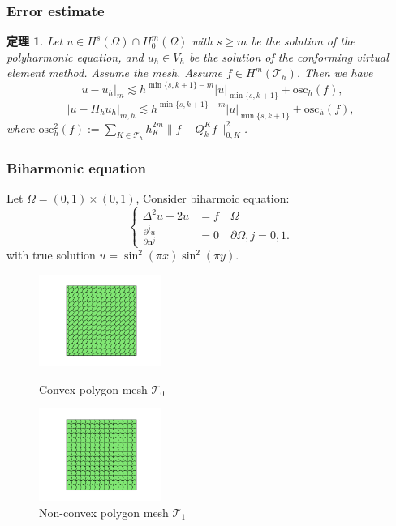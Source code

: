 \documentclass[notheorems,serif]{beamer}
\newcommand{\hei}[1]{{\HEI#1}}
\newtheorem{theorem}{\hei{定理}}
\begin{document}
\begin{frame}
\frametitle{Error estimate}
\begin{theorem}\label{errorestimate}
Let $u\in H^s(\Omega)\cap H_0^m(\Omega)$ with $s\geq m$ be the solution of the
polyharmonic equation, and $u_h\in V_h$ be the solution
of the conforming virtual element method. Assume the mesh. Assume
$f\in H^m(\mathcal T_h)$. Then we have
$$
|u-u_h|_m\lesssim h^{\min\{s,k+1\}-m}|u|_{\min\{s,k+1\}}+\textrm{osc}_h(f),
$$
$$
|u-\Pi_hu_h|_{m,h}\lesssim h^{\min\{s,k+1\}-m}|u|_{\min\{s,k+1\}}+\textrm{osc}_h(f),
$$
where $\textrm{osc}_h^2(f):=\sum\limits_{K\in\mathcal T_h}h_K^{2m}\|f-Q_k^Kf\|_{0,K}^2$.
\end{theorem}

\end{frame}

\begin{frame}
  \frametitle{Biharmonic equation}
  Let $\Omega = (0, 1)\times(0, 1)$, Consider biharmoic equation:
  $$
  \left\{
  \begin{aligned} 
      \Delta^2 u + 2u & = f \quad \Omega\\
      \frac{\partial^j u}{\partial \boldsymbol{n}^j} & = 0 \quad \partial\Omega,
      j = 0, 1.
  \end{aligned}
  \right.
  $$
  with true solution $u = \sin^2(\pi x)\sin^2(\pi y)$.

\begin{figure}[htb p]
\centering
\begin{minipage}[t]{0.49\linewidth}
\centering
\includegraphics[width=4cm]{../figures/convex.pdf}
\caption{Convex polygon mesh $\mathcal T_0$}
\end{minipage}%
\begin{minipage}[t]{0.49\linewidth}
\centering
\includegraphics[width=4cm]{../figures/nonconvex.pdf}
\caption{Non-convex polygon mesh $\mathcal T_1$}
\end{minipage}%
\centering
\label{fig:mesh}
\end{figure}
\end{frame}
\end{document}

